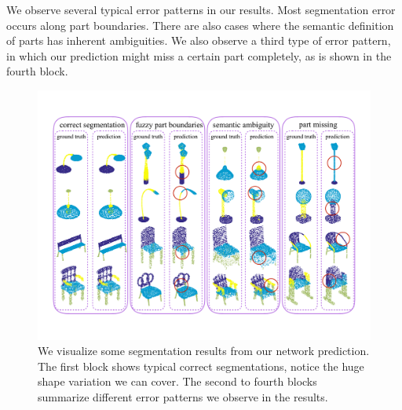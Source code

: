We observe several typical error patterns in our results. Most segmentation error occurs along part boundaries. %
There are also cases where the semantic definition of parts has inherent ambiguities. %
We also observe a third type of error pattern, in which our prediction might miss a certain part completely, as is shown in the fourth block.

\begin{figure}
    \centering
    \includegraphics[width=\linewidth]{./fig/erroranalysis4.pdf}
    \caption{We visualize some segmentation results from our network prediction. The first block shows typical correct segmentations, notice the huge shape variation we can cover. The second to fourth blocks summarize different error patterns we observe in the results.}
    \label{fig:erroranalysis}
\end{figure}

